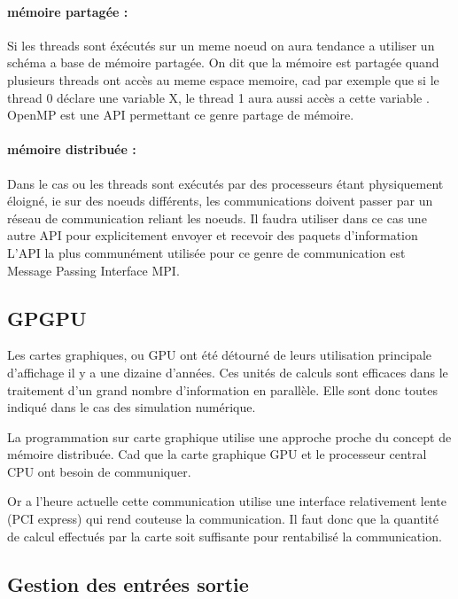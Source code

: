 \paragraph{mémoire partagée : } 
Si les threads sont éxécutés sur un meme noeud on aura tendance a utiliser un schéma a base de mémoire partagée.
On dit que la mémoire est partagée quand plusieurs threads ont accès au meme espace memoire, cad par exemple que si le thread 0 déclare une variable X, le thread 1 aura aussi accès a cette variable . 
OpenMP est une API permettant ce  genre partage de mémoire.

\paragraph{mémoire distribuée : } 
Dans le cas ou les threads sont exécutés par des processeurs étant physiquement éloigné, ie sur des noeuds différents, les communications doivent passer par un réseau de communication reliant les noeuds.
Il faudra utiliser dans ce cas une autre API pour explicitement envoyer et recevoir des paquets d'information
L'API la plus communément utilisée pour ce genre de communication est Message Passing Interface MPI.




\subsection{GPGPU}

Les cartes graphiques, ou GPU ont été détourné de leurs utilisation principale d'affichage il y a une dizaine d'années.
Ces unités de calculs sont  efficaces dans le traitement d'un grand nombre d'information en parallèle.
Elle sont donc toutes indiqué dans le cas des simulation numérique.

La programmation sur carte graphique utilise une approche proche du concept de mémoire distribuée.
Cad que la carte graphique GPU et le processeur central CPU ont besoin de communiquer.

Or a l'heure actuelle cette communication utilise une interface relativement lente (PCI express) qui rend couteuse la communication. 
Il faut donc que la quantité de calcul effectués par la carte soit suffisante pour rentabilisé la communication.





\subsection{Gestion des entrées sortie}

